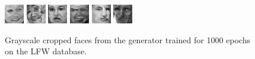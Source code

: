 \begin{figure}[!h]
{        \includegraphics[scale=1]{figures/lfw/appendix1/lfw32x32bw_image0042.png}
        \includegraphics[scale=1]{figures/lfw/appendix1/lfw32x32bw_image0043.png}
        \includegraphics[scale=1]{figures/lfw/appendix1/lfw32x32bw_image0044.png}
        \includegraphics[scale=1]{figures/lfw/appendix1/lfw32x32bw_image0045.png}
        \includegraphics[scale=1]{figures/lfw/appendix1/lfw32x32bw_image0046.png}
        \includegraphics[scale=1]{figures/lfw/appendix1/lfw32x32bw_image0047.png}
    }
    \caption{\label{fig:appendix-lfw1}Grayscale cropped faces from the generator trained for 1000 epochs on the LFW database.}
\end{figure}

